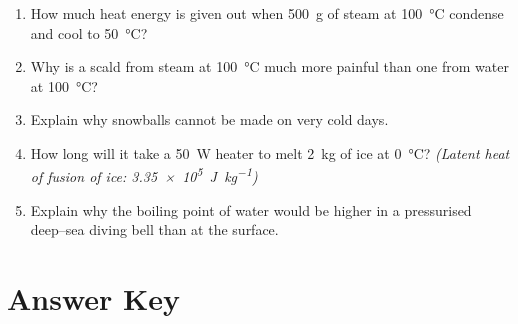 \documentclass{article}
\begin{document}
\begin{enumerate}
\item How much heat energy is given out when \SI{500}{\gram} of steam at \SI{100}{\celsius} condense and cool to \SI{50}{\celsius}?

\item Why is a scald from steam at \SI{100}{\celsius} much more painful than one from water at \SI{100}{\celsius}?

\item Explain why snowballs cannot be made on very cold days.

\item How long will it take a \SI{50}{\watt} heater to melt \SI{2}{\kilogram} of ice at \SI{0}{\celsius}?  
\textit{(Latent heat of fusion of ice: \SI{3.35e5}{\joule\per\kilogram})}

\item Explain why the boiling point of water would be higher in a pressurised deep--sea diving bell than at the surface.

\end{enumerate}

\newpage
\section*{Answer Key}
\end{document}
